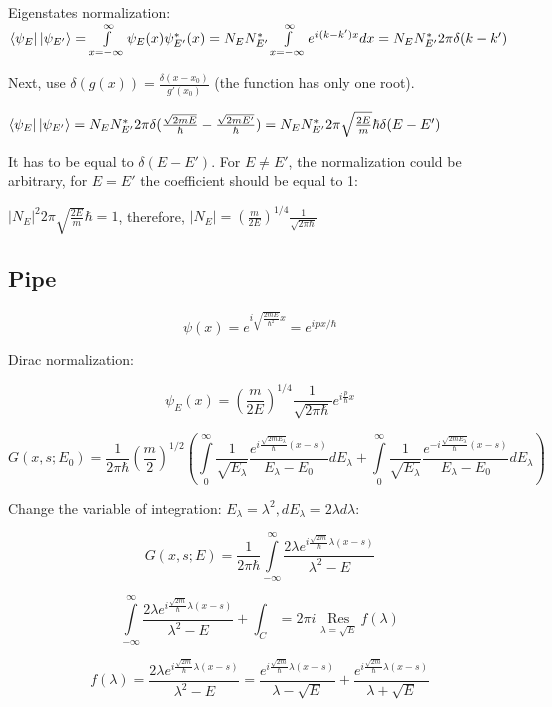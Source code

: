 \documentclass[12pt, a4paper]{article}
\def\res{\mathop{\operatorname{Res}}\limits}
\begin{document}
Eigenstates normalization: $\bra{\psi_E} \ket{\psi_{E'}} = \int\limits_{x = - \infty}^\infty \psi_E(x) \psi_{E'}^*(x) = N_E N_{E'}^* \int\limits_{x = - \infty}^\infty e^{i (k - k') x} dx = \\ N_E N^*_{E'} 2 \pi \delta(k - k')$

Next, use $\delta(g(x)) = \frac{\delta(x - x_0)}{g'(x_0)}$ (the function has only one root).

$\bra{\psi_E} \ket{\psi_{E'}} = N_E N^*_{E'} 2 \pi \delta(\frac{\sqrt{2 m E}}{\hbar} - \frac{\sqrt{2 m E'}}{\hbar}) = N_E N^*_{E'} 2 \pi \sqrt{\frac{2 E }{m}} \hbar \delta(E - E')$

It has to be equal to $\delta(E - E')$. For $E \ne E'$, the normalization could be arbitrary, for $E = E'$ the coefficient should be equal to 1:

$|N_E|^2 2 \pi \sqrt{\frac{2 E}{m}} \hbar = 1$, therefore, $|N_E| = \left( \frac{m}{2E}\right)^{1/4}  \frac{1}{\sqrt{2 \pi \hbar}}$



\subsection{Pipe}
$$\psi(x) = e^{i \sqrt{\frac{2 m E}{\hbar^2}} x} = e^{i p x / \hbar}$$

Dirac normalization:

$$\psi_E(x) = \left( \frac{m}{2E}\right)^{1/4}  \frac{1}{\sqrt{2 \pi \hbar}} e^{i \frac{p}{\hbar} x}$$

$$G(x, s; E_0) = \frac{1}{2 \pi \hbar} \left( \frac{m}{2}\right)^{1/2}  \left( \int\limits_{0}^{\infty} \frac{1}{\sqrt{E_\lambda}}\frac{e^{i \frac{\sqrt{2 m E_\lambda}}{\hbar} (x - s)}}{E_\lambda - E_0} d E_\lambda + \int\limits_{0}^{\infty} \frac{1}{\sqrt{E_\lambda}}\frac{e^{-i \frac{\sqrt{2 m E_\lambda}}{\hbar} (x - s)}}{E_\lambda - E_0} d E_\lambda \right)$$

Change the variable of integration: $E_\lambda = \lambda^2, d E_\lambda = 2 \lambda d \lambda$:

$$G(x, s; E) = \frac{1}{2 \pi \hbar} \int\limits_{-\infty}^\infty \frac{2 \lambda e^{i \frac{\sqrt{2m}}{\hbar} \lambda (x - s)}}{\lambda^2 - E}$$

$$\int\limits_{-\infty}^\infty \frac{2 \lambda e^{i \frac{\sqrt{2m}}{\hbar} \lambda (x - s)}}{\lambda^2 - E} + \int_C = 2 \pi i \res_{\lambda = \sqrt{E}} f(\lambda)$$

$$f(\lambda) = \frac{2 \lambda e^{i \frac{\sqrt{2m}}{\hbar} \lambda (x - s)}}{\lambda^2 - E} = \frac{e^{i \frac{\sqrt{2m}}{\hbar} \lambda (x - s)}}{\lambda - \sqrt{E}} + \frac{e^{i \frac{\sqrt{2m}}{\hbar} \lambda (x - s)}}{\lambda + \sqrt{E}}$$
\end{document}
